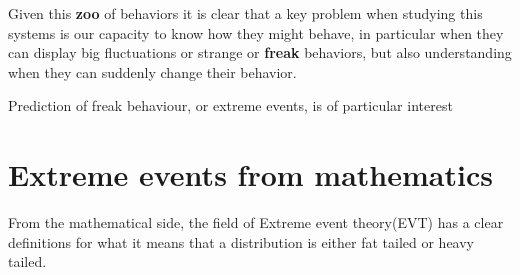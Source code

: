 Given this \textbf{zoo} of behaviors it is clear that a key problem when studying this systems is our capacity to know how they might behave, in particular when they can display big fluctuations or strange or \textbf{freak} behaviors, but also understanding when they can suddenly change their behavior. 

Prediction of freak behaviour, or extreme events, is of particular interest



%
%
%
%


\section{Extreme events from mathematics}
From the mathematical side, the field of Extreme event theory(EVT)\cite{some book} has a clear definitions for what it means that a distribution is either fat tailed or heavy tailed.

